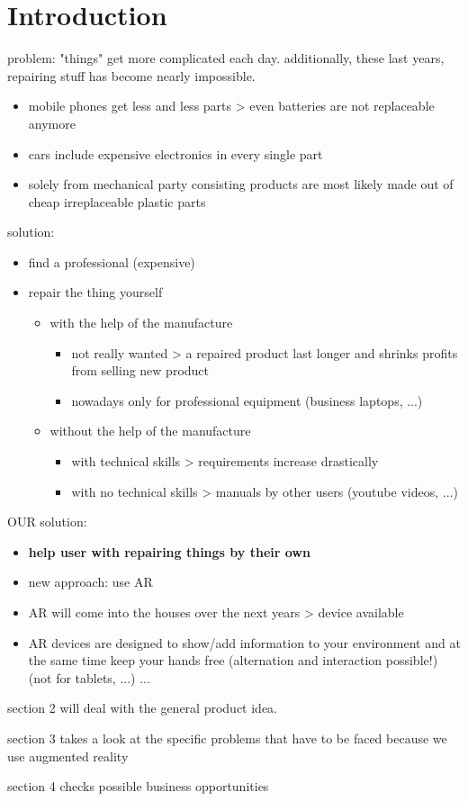 
\chapter{Introduction}
	
	problem: "things" get more complicated each day. additionally, these last years, repairing stuff has become nearly impossible.
	
	\begin{itemize}
		\itemsep0em
		\item mobile phones get less and less parts > even batteries are not replaceable anymore
		\item cars include expensive electronics in every single part
		\item solely from mechanical party consisting products are most likely made out of cheap irreplaceable plastic parts
	\end{itemize}
	
	solution:
	\begin{itemize}
		\itemsep0em
		\item find a professional (expensive)
		\item repair the thing yourself \begin{itemize}
			\itemsep0em
			\item with the help of the manufacture \begin{itemize}
				\item not really wanted > a repaired product last longer and shrinks profits from selling new product
				\item nowadays only for professional equipment (business laptops, ...)
			\end{itemize}
			\item without the help of the manufacture \begin{itemize}
				\itemsep0em
				\item with technical skills > requirements increase drastically
				\item with no technical skills > manuals by other users (youtube videos, ...)
			\end{itemize}
		\end{itemize}
	\end{itemize}
	
	OUR solution:
	\begin{itemize}
		\itemsep0em
		\item \textbf{help user with repairing things by their own}
		\item new approach: use AR
		\item AR will come into the houses over the next years > device available
		\item AR devices are designed to show/add information to your environment and at the same time keep your hands free (alternation and interaction possible!) (not for tablets, ...) ...
	\end{itemize}
	
	
	section 2 will deal with the general product idea.
	
	section 3 takes a look at the specific problems that have to be faced because we use augmented reality
	
	section 4 checks possible business opportunities
